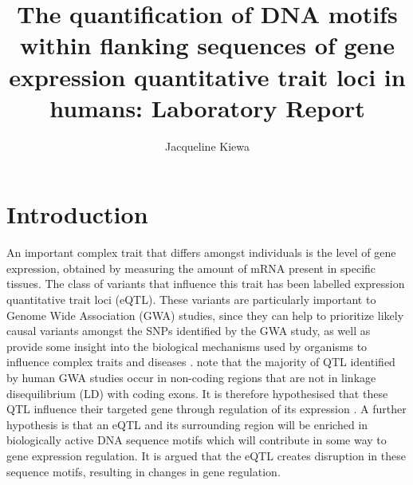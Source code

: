 \documentclass[12pt]{article}
\begin{document}


\title{The quantification of DNA motifs within flanking sequences of gene expression quantitative trait loci in humans: Laboratory Report}


\author{Jacqueline Kiewa}





\doublespacing
\maketitle
\clearpage
\tableofcontents


\clearpage
\section{Introduction}

An important complex trait that differs amongst individuals is the level of gene expression, obtained by measuring the amount of mRNA present in specific tissues. The class of variants that influence this trait has been labelled expression quantitative trait loci (eQTL). These variants are particularly important to Genome Wide Association (GWA) studies, since they can help to prioritize likely causal variants amongst the SNPs identified by the GWA study, as well as provide some insight into the biological mechanisms used by organisms to influence complex traits and diseases \citep{albert2015role}. \citet{albert2015role} note that the majority of QTL identified by human GWA studies occur in non-coding regions that are not in linkage disequilibrium (LD) with coding exons. It is therefore hypothesised that these QTL influence their targeted gene through regulation of its expression \citep{nica2013expression}. A further hypothesis is that an eQTL and its surrounding region will be enriched in biologically active DNA sequence motifs which will contribute in some way to gene expression regulation. It is argued that the eQTL creates disruption in these sequence motifs, resulting in changes in gene regulation. 
\end{document}
